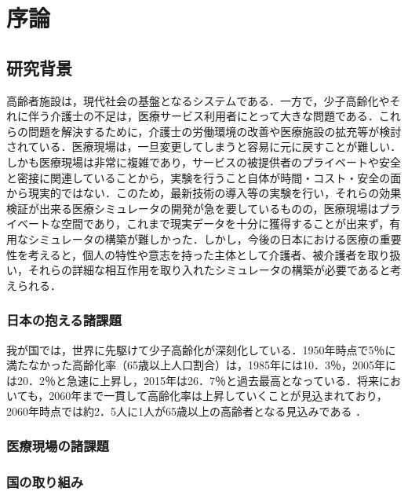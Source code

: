 \chapter{序論}

\section{研究背景}

高齢者施設は，現代社会の基盤となるシステムである．一方で，少子高齢化やそれに伴う介護士の不足は，医療サービス利用者にとって大きな問題である．これらの問題を解決するために，介護士の労働環境の改善や医療施設の拡充等が検討されている．医療現場は，一旦変更してしまうと容易に元に戻すことが難しい．しかも医療現場は非常に複雑であり，サービスの被提供者のプライベートや安全と密接に関連していることから，実験を行うこと自体が時間・コスト・安全の面から現実的ではない．このため，最新技術の導入等の実験を行い，それらの効果検証が出来る医療シミュレータの開発が急を要しているものの，医療現場はプライベートな空間であり，これまで現実データを十分に獲得することが出来ず，有用なシミュレータの構築が難しかった．しかし，今後の日本における医療の重要性を考えると，個人の特性や意志を持った主体として介護者、被介護者を取り扱い，それらの詳細な相互作用を取り入れたシミュレータの構築が必要であると考えられる．

\subsection{日本の抱える諸課題}

我が国では，世界に先駆けて少子高齢化が深刻化している．1950年時点で5％に満たなかった高齢化率（65歳以上人口割合）は，1985年には10．3％，2005年には20．2％と急速に上昇し，2015年は26．7％と過去最高となっている．将来においても，2060年まで一貫して高齢化率は上昇していくことが見込まれており，2060年時点では約2．5人に1人が65歳以上の高齢者となる見込みである \cite{ex_kousei_v1}．

\subsection{医療現場の諸課題}


\subsection{国の取り組み}

